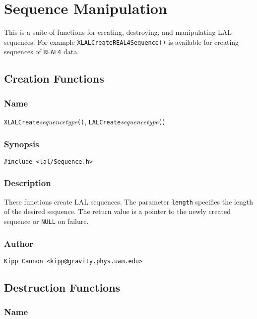 \clearpage
\section{Sequence Manipulation}
\label{s:SequenceManipulation}

This is a suite of functions for creating, destroying, and manipulating LAL
sequences.  For example \texttt{XLALCreateREAL4Sequence()} is available for
creating sequences of \texttt{REAL4} data.

\subsection{Creation Functions}

\subsubsection{Name}

\texttt{XLALCreate}\textit{sequencetype}\texttt{()},
\texttt{LALCreate}\textit{sequencetype}\texttt{()}

\subsubsection{Synopsis}

\begin{verbatim}
#include <lal/Sequence.h>
\end{verbatim}


\subsubsection{Description}

These functions create LAL sequences.  The parameter \texttt{length}
specifies the length of the desired sequence.  The return value is a
pointer to the newly created sequence or \texttt{NULL} on failure.

\subsubsection{Author}

\verb|Kipp Cannon <kipp@gravity.phys.uwm.edu>|


\subsection{Destruction Functions}

\subsubsection{Name}

